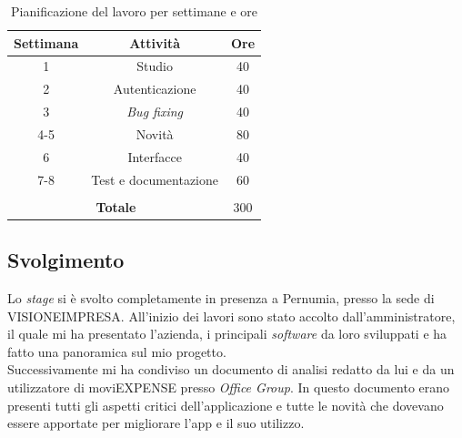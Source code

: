 \renewcommand{\arraystretch}{1.3}
\begin{table}[H]
    \centering
        \begin{tabular}{| c | c | c |} 
        \hline
        \textbf{Settimana} & \textbf{Attività} & \textbf{Ore} \\
        \hline
        1 & Studio & 40 \\ 
        \hline
        2 & Autenticazione & 40 \\
        \hline
        3 & \textit{Bug fixing} & 40 \\
        \hline
        4-5 & Novità & 80 \\
        \hline
        6 & Interfacce & 40 \\
        \hline
        7-8 & Test e documentazione & 60 \\
        \hline
        \multicolumn{3}{c}{\rule{0pt}{1em}} \\
        \hline
        \multicolumn{2}{|c|}{\textbf{Totale}} & 300 \\
        \hline
        \end{tabular}
        \caption{Pianificazione del lavoro per settimane e ore}
\end{table}
\renewcommand{\arraystretch}{1}

\subsection{Svolgimento}

Lo \textit{stage} si è svolto completamente in presenza a Pernumia, presso la sede di VISIONEIMPRESA. All'inizio dei lavori sono stato accolto dall'amministratore, il quale mi ha presentato l'azienda, i principali \textit{software} da loro sviluppati e ha fatto una panoramica sul mio progetto.\\
Successivamente mi ha condiviso un documento di analisi redatto da lui e da un utilizzatore di moviEXPENSE presso \textit{Office Group}. In questo documento erano presenti tutti gli aspetti critici dell'applicazione e tutte le novità che dovevano essere apportate per migliorare l'app e il suo utilizzo.